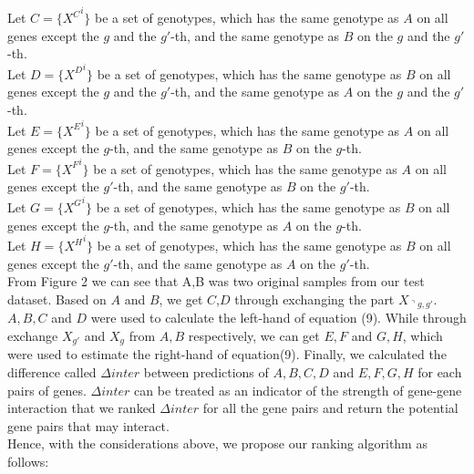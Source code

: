 \documentclass[11pt]{article}
\theoremstyle{plain}
\theoremstyle{definition}
\theoremstyle{remark}
\begin{document}
Let $C=\{{X^C}^i\}$ be a set of genotypes, which has the same genotype as $A$ on all genes except the $g$ and the $g'$-th, and the same genotype as $B$ on the $g$ and the $g'$-th.\\
Let  $D=\{{X^D}^i\}$ be a set of genotypes, which has the same genotype as $B$ on all genes except the $g$ and the $g'$-th, and the same genotype as $A$ on the $g$ and the $g'$-th.\\
Let  $E=\{{X^E}^i\}$ be a set of genotypes, which has the same genotype as $A$ on all genes except the $g$-th, and the same genotype as $B$ on the $g$-th.\\
Let  $F=\{{X^F}^i\}$ be a set of genotypes, which has the same genotype as $A$ on all genes except the $g'$-th, and the same genotype as $B$ on the $g'$-th.\\
Let  $G=\{{X^G}^i\}$ be a set of genotypes, which has the same genotype as $B$ on all genes except the $g$-th, and the same genotype as $A$ on the $g$-th.\\
Let  $H=\{{X^H}^i\}$ be a set of genotypes, which has the same genotype as $B$ on all genes except the $g'$-th, and the same genotype as $A$ on the $g'$-th.\\

\noindent From Figure 2 we can see that A,B was two original samples from our test dataset. Based on $A$ and $B$, we get $C$,$D$ through exchanging the part $X_{\urcorner g,g'}$. $A,B,C$ and $D$ were used to calculate the left-hand of equation (9). While through exchange $X_{g'}$ and $X_g$ from $A,B$ respectively, we can get $E,F$ and $G,H$, which were used to estimate the right-hand of equation(9). Finally, we calculated the difference called $\Delta inter$ between predictions of $A,B,C,D$ and $E,F,G,H$ for each pairs of genes. $\Delta inter$ can be treated as an indicator of the strength of gene-gene interaction that we ranked $\Delta inter$ for all the gene pairs and return the potential gene pairs that may interact.\\

\noindent Hence, with the considerations above, we propose our ranking algorithm as follows:
\end{document}
